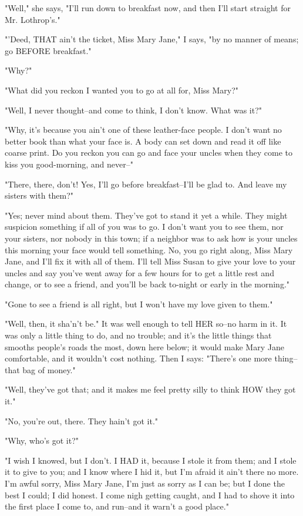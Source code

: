 "Well," she says, "I'll run down to breakfast now, and then I'll start
straight for Mr. Lothrop's."

"'Deed, THAT ain't the ticket, Miss Mary Jane," I says, "by no manner of
means; go BEFORE breakfast."

"Why?"

"What did you reckon I wanted you to go at all for, Miss Mary?"

"Well, I never thought--and come to think, I don't know.  What was it?"

"Why, it's because you ain't one of these leather-face people.  I don't
want no better book than what your face is.  A body can set down and read
it off like coarse print.  Do you reckon you can go and face your uncles
when they come to kiss you good-morning, and never--"

"There, there, don't!  Yes, I'll go before breakfast--I'll be glad to.
And leave my sisters with them?"

"Yes; never mind about them.  They've got to stand it yet a while.  They
might suspicion something if all of you was to go.  I don't want you to
see them, nor your sisters, nor nobody in this town; if a neighbor was to
ask how is your uncles this morning your face would tell something.  No,
you go right along, Miss Mary Jane, and I'll fix it with all of them.
I'll tell Miss Susan to give your love to your uncles and say you've went
away for a few hours for to get a little rest and change, or to see a
friend, and you'll be back to-night or early in the morning."

"Gone to see a friend is all right, but I won't have my love given to
them."

"Well, then, it sha'n't be."  It was well enough to tell HER so--no harm
in it.  It was only a little thing to do, and no trouble; and it's the
little things that smooths people's roads the most, down here below; it
would make Mary Jane comfortable, and it wouldn't cost nothing.  Then I
says:  "There's one more thing--that bag of money."

"Well, they've got that; and it makes me feel pretty silly to think HOW
they got it."

"No, you're out, there.  They hain't got it."

"Why, who's got it?"

"I wish I knowed, but I don't.  I HAD it, because I stole it from them;
and I stole it to give to you; and I know where I hid it, but I'm afraid
it ain't there no more.  I'm awful sorry, Miss Mary Jane, I'm just as
sorry as I can be; but I done the best I could; I did honest.  I come
nigh getting caught, and I had to shove it into the first place I come
to, and run--and it warn't a good place."

